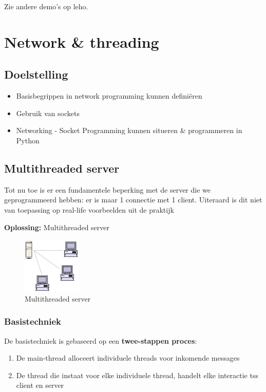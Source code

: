\documentclass{article}
\begin{document}
Zie andere demo's op leho.

\section{Network \& threading}

\subsection{Doelstelling}

\begin{itemize}
    \item Basisbegrippen in network programming kunnen definiëren
    \item Gebruik van sockets
    \item Networking - Socket Programming kunnen situeren \& programmeren in Python
\end{itemize}

\subsection{Multithreaded server}

Tot nu toe is er een fundamentele beperking met de server die we geprogrammeerd hebben:
er is maar 1 connectie met 1 client. Uiteraard is dit niet van toepassing op real-life voorbeelden uit de praktijk

\textbf{Oplossing:} Multithreaded server

\begin{figure}[H]
    \centering
    \includegraphics[width=0.25\textwidth]{multithreaded-server.png}
    \caption{Multithreaded server}
\end{figure}

\subsubsection{Basistechniek}

De basistechniek is gebaseerd op een \textbf{twee-stappen proces}:

\begin{enumerate}
    \item De main-thread alloceert individuele threads voor inkomende messages
    \item De thread die instaat voor elke individuele thread, handelt elke interactie tss client en server
\end{enumerate}
\end{document}
